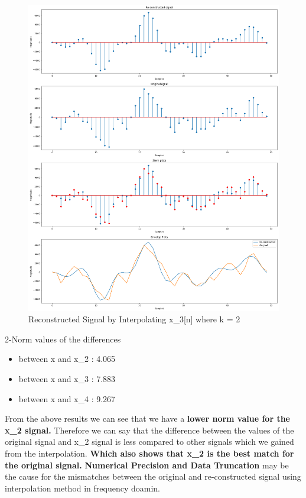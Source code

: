 \documentclass[11pt,a4paper]{article}
\begin{document}
\newpage

{\begin{figure}[h]
    \centering
    \includegraphics[width=1.0\linewidth]{images/5-2.png}
    \caption{Reconstructed Signal by Interpolating x\_3[n] where k = 2}
\end{figure}}

2-Norm values of the differences
\begin{itemize}
    \item between x and x\_2 : 4.065
    \item between x and x\_3 : 7.883
    \item between x and x\_4 : 9.267
\end{itemize}

From the above results we can see that we have a \textbf{lower norm value for the x\_2 signal.}
Therefore we can say that the difference between the values of the original signal and x\_2 signal is less compared to other signals which we gained from the interpolation.
\textbf{Which also shows that x\_2 is the best match for the original signal.}
\newline
\newline
\textbf{Numerical Precision and Data Truncation} may be the cause for the mismatches between the original and re-constructed signal using interpolation method in frequency doamin.
\end{document}
